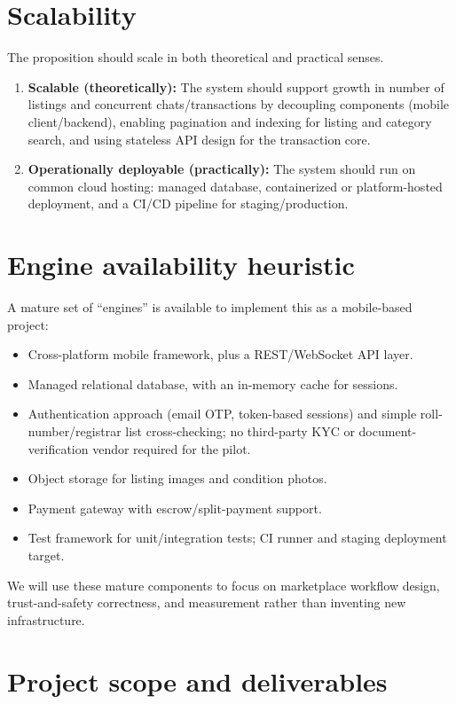 \documentclass[11pt]{article}
\begin{document}
\section{Scalability}
The proposition should scale in both theoretical and practical senses.
\begin{enumerate}[leftmargin=*]
\item \textbf{Scalable (theoretically):} The system should support growth in number of listings and concurrent chats/transactions by decoupling components (mobile client/backend), enabling pagination and indexing for listing and category search, and using stateless API design for the transaction core.
\item \textbf{Operationally deployable (practically):} The system should run on common cloud hosting: managed database, containerized or platform-hosted deployment, and a CI/CD pipeline for staging/production.
\end{enumerate}

\section{Engine availability heuristic}
A mature set of ``engines'' is available to implement this as a mobile-based project:
\begin{itemize}[leftmargin=*]
\item Cross-platform mobile framework, plus a REST/WebSocket API layer.
\item Managed relational database, with an in-memory cache for sessions.
\item Authentication approach (email OTP, token-based sessions) and simple roll-number/registrar list cross-checking; no third-party KYC or document-verification vendor required for the pilot.
\item Object storage for listing images and condition photos.
\item Payment gateway with escrow/split-payment support.
\item Test framework for unit/integration tests; CI runner and staging deployment target.
\end{itemize}
We will use these mature components to focus on marketplace workflow design, trust-and-safety correctness, and measurement rather than inventing new infrastructure.

\section{Project scope and deliverables}
\end{document}
